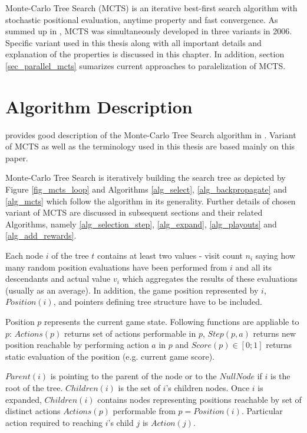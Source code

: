 Monte-Carlo Tree Search (MCTS) is an iterative best-first search algorithm with stochastic positional
evaluation, anytime property and fast convergence. As \citeauthor{ChaslotPhd2010} summed up in 
\cite{ChaslotPhd2010}, MCTS was simultaneously developed
in three variants \cites{Chaslot2006}{Coulom2006}{Kocsis2006} in 2006. Specific variant used in
this thesis along with all important details and explanation of the properties is discussed in this
chapter. In addition, section \ref{sec_parallel_mcts} sumarizes current approaches to paralelization
of MCTS.

\section{Algorithm Description}

\citeauthor{Chaslot2008} provides good description of the Monte-Carlo Tree Search algorithm in
\cite{Chaslot2008}. Variant of MCTS as well as the terminology used in this thesis are based mainly
on this paper.


Monte-Carlo Tree Search is iteratively building the search tree as depicted by Figure
\ref{fig_mcts_loop} and Algorithms \ref{alg_select}, \ref{alg_backpropagate} and \ref{alg_mcts}
which follow the algorithm in its generality. Further details of chosen variant of MCTS
are discussed in subsequent sections and their related Algorithms, namely \ref{alg_selection_step},
\ref{alg_expand}, \ref{alg_playouts} and \ref{alg_add_rewards}.

Each node $i$ of the tree $t$ contains at least two values - visit count $n_i$
saying how many random position evaluations have been performed from $i$ and all its
descendants and
actual value $v_i$ which aggregates the results of these evaluations (usually as an average).
In addition, the game position represented by $i$, $Position(i)$, and pointers defining
tree structure have to be included. 

Position $p$ represents the current game state. Following
functions are appliable to $p$: $Actions(p)$ returns set of actions performable in $p$,
$Step(p, a)$ returns new position reachable by performing action $a$ in $p$ and $Score(p) \in
[0;1]$ returns static evaluation of the position (e.g. current game score).

$Parent(i)$ is
pointing to the parent of the node or to the $NullNode$ if $i$ is the root of the tree.
$Children(i)$ is the set of $i$'s children nodes. Once $i$ is expanded, $Children(i)$ contains
nodes representing positions reachable by set of
distinct actions $Actions(p)$ performable from $p = Position(i)$.
Particular action required to reaching $i$'s child $j$ is $Action(j)$.

